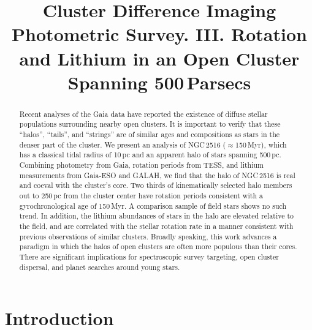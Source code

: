 \documentclass[12pt,twocolumn,tighten]{aastex63}
\begin{document}

\title{
  Cluster Difference Imaging Photometric Survey. III.
  Rotation and Lithium in an Open Cluster Spanning 500\,Parsecs
}



%
%
\begin{abstract}
  Recent analyses of the Gaia data have reported the existence of
  diffuse stellar populations surrounding nearby open clusters.  It is
  important to verify that these ``halos'', ``tails'', and ``strings''
  are of similar ages and compositions as stars in the denser part of
  the cluster.  We present an analysis of NGC\,2516
  ($\approx$150\,Myr), which has a classical tidal radius of 10\,pc
  and an apparent halo of stars spanning 500\,pc.  Combining
  photometry from Gaia, rotation periods from TESS, and lithium
  measurements from Gaia-ESO and GALAH, we find that the halo of
  NGC\,2516 is real and coeval with the cluster's core.  Two thirds of
  kinematically selected halo members out to 250\,pc from the cluster
  center have rotation periods consistent with a gyrochronological age
  of 150\,Myr.  A comparison sample of field stars shows no such
  trend.  In addition, the lithium abundances of stars in the halo are
  elevated relative to the field, and are correlated with the stellar
  rotation rate in a manner consistent with previous observations of
  similar clusters.  Broadly speaking, this work advances a paradigm
  in which the halos of open clusters are often more populous than
  their cores.  There are significant implications for spectroscopic
  survey targeting, open cluster dispersal, and planet searches around
  young stars.
\end{abstract}




\section{Introduction}
\end{document}
